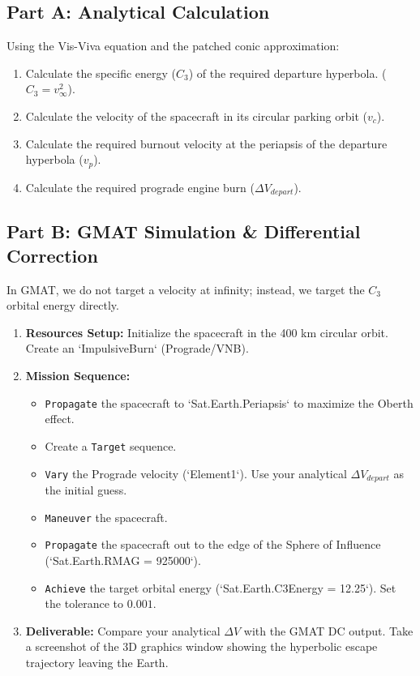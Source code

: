 \documentclass[11pt, letterpaper]{article}
\begin{document}
\subsection*{Part A: Analytical Calculation}
Using the Vis-Viva equation and the patched conic approximation:
\begin{enumerate}
    \item Calculate the specific energy ($C_3$) of the required departure hyperbola. ($C_3 = v_\infty^2$).
    \item Calculate the velocity of the spacecraft in its circular parking orbit ($v_c$).
    \item Calculate the required burnout velocity at the periapsis of the departure hyperbola ($v_p$).
    \item Calculate the required prograde engine burn ($\Delta V_{depart}$).
\end{enumerate}

\subsection*{Part B: GMAT Simulation \& Differential Correction}
In GMAT, we do not target a velocity at infinity; instead, we target the $C_3$ orbital energy directly.
\begin{enumerate}
    \item \textbf{Resources Setup:} Initialize the spacecraft in the 400 km circular orbit. Create an `ImpulsiveBurn` (Prograde/VNB). 
    \item \textbf{Mission Sequence:}
        \begin{itemize}
            \item \texttt{Propagate} the spacecraft to `Sat.Earth.Periapsis` to maximize the Oberth effect.
            \item Create a \texttt{Target} sequence.
            \item \texttt{Vary} the Prograde velocity (`Element1`). Use your analytical $\Delta V_{depart}$ as the initial guess.
            \item \texttt{Maneuver} the spacecraft.
            \item \texttt{Propagate} the spacecraft out to the edge of the Sphere of Influence (`Sat.Earth.RMAG = 925000`).
            \item \texttt{Achieve} the target orbital energy (`Sat.Earth.C3Energy = 12.25`). Set the tolerance to $0.001$.
        \end{itemize}
    \item \textbf{Deliverable:} Compare your analytical $\Delta V$ with the GMAT DC output. Take a screenshot of the 3D graphics window showing the hyperbolic escape trajectory leaving the Earth.
\end{enumerate}
\end{document}

